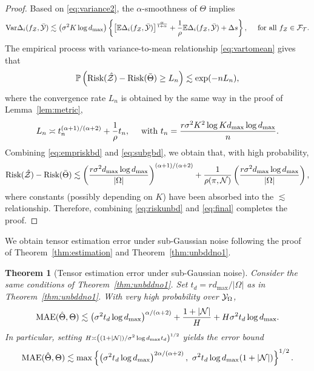 \documentclass[11pt]{article}
\theoremstyle{plain}
\newtheorem{thm}{Theorem}
\theoremstyle{definition}
\begin{document}
\begin{proof}
Based on \eqref{eq:variance2}, the $\alpha$-smoothness of $\Theta$ implies
\begin{align}\label{eq:vartomean}
\text{Var}\Delta_i(f_{\mathcal{Z}},\bar {\mathcal{Y}})\lesssim \left(\sigma^2K\log d_{\max}\right) \left\{\left[\mathbb{E}\Delta_i(f_{\mathcal{Z}},\bar{\mathcal{Y}})\right]^{\alpha\over1+\alpha}+\frac{1}{\rho}\mathbb{E}\Delta_i(f_{\mathcal{Z}},\bar{\mathcal{Y}})+\Delta s\right\},\quad\text{ for all } f_{\mathcal{Z}}\in\mathcal{F}_{\mathcal{T}}.
\end{align}
The empirical process with variance-to-mean relationship \eqref{eq:vartomean} gives that
\begin{align}\label{eq:empriskbd}
\mathbb{P	}\left(\text{Risk}(\hat{\mathcal{Z}})-\text{Risk}(\bar\Theta)\geq L_n\right)\lesssim \exp(-nL_n),
\end{align}
where the convergence rate $L_n$ is obtained by the same way in the proof of Lemma~\ref{lem:metric}, 
\begin{align}\label{eq:subgbd}
L_n\asymp t_n^{(\alpha+1)/(\alpha+2)}+\frac{1}{\rho}t_n,\quad\text{ with } t_n =  {r \sigma^2 K^2\log K d_{\max}\log d_{\max}  \over n}.
\end{align}
Combining \eqref{eq:empriskbd} and \eqref{eq:subgbd}, we obtain that, with high probability, 
\begin{align}\label{eq:riskunbd}
   \text{Risk}(\hat{\mathcal{Z}})-\text{Risk}(\bar\Theta)\lesssim \left( {r \sigma^2  d_{\max}\log d_{\max}  \over |\Omega|}\right)^{(\alpha+1)/(\alpha+2)}+\frac{1}{\rho(\pi,\mathcal{N})} \left({r \sigma^2  d_{\max} \log d_{\max} \over |\Omega|} \right),
\end{align} 
where constants (possibly depending on $K$) have been absorbed into the $\lesssim$ relationship. Therefore, combining \eqref{eq:riskunbd} and \eqref{eq:final} completes the proof.
\end{proof}

We obtain tensor estimation error under sub-Gaussian noise following the proof of Theorem~\ref{thm:estimation} and Theorem~\ref{thm:unbddno1}.
\begin{thm}[Tensor estimation error under sub-Gaussian noise] Consider the same conditions of Theorem~\ref{thm:unbddno1}. Set $t_d = {r d_{\max}/|\Omega|}$ as in Theorem~\ref{thm:unbddno1}. With very high probability over $\mathcal{Y}_\Omega$,
\begin{equation}\label{eq:bound2}
\textup{MAE}(\hat \Theta, \Theta)\lesssim \left(\sigma^2t_d\log d_{\max}\right)^{\alpha/(\alpha+2)}+{1+|\mathcal{N}|\over H}+{H\sigma^2t_d \log d_{\max} }.
\end{equation}
In particular, setting $\scriptstyle H\asymp \left( (1+|\mathcal{N}|)/ \sigma^2\log d_{\max} t_d \right)^{1/2}$ yields the error bound
\begin{equation}\label{eq:real}
\textup{MAE}(\hat \Theta, \Theta)\lesssim \max\left\{\left(\sigma^2t_d \log d_{\max} \right)^{{2\alpha/ (\alpha+2)} },\ \sigma^2t_d \log d_{\max}(1+|\mathcal{N}|)\right\}^{1/2}.
\end{equation}
\end{thm}
\end{document}
